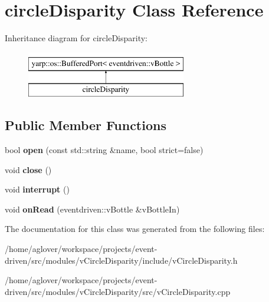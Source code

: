 \hypertarget{classcircleDisparity}{}\section{circle\+Disparity Class Reference}
\label{classcircleDisparity}
Inheritance diagram for circle\+Disparity\+:\begin{figure}[H]
\begin{center}
\leavevmode
\includegraphics[height=2.000000cm]{classcircleDisparity}
\end{center}
\end{figure}
\subsection*{Public Member Functions}
\begin{DoxyCompactItemize}
\item 
bool {\bfseries open} (const std\+::string \&name, bool strict=false)\hypertarget{classcircleDisparity_a5be77ddfdbb425def639e31b53226687}{}\label{classcircleDisparity_a5be77ddfdbb425def639e31b53226687}

\item 
void {\bfseries close} ()\hypertarget{classcircleDisparity_ac492ff92d6e537bdfcee8aac01413d1f}{}\label{classcircleDisparity_ac492ff92d6e537bdfcee8aac01413d1f}

\item 
void {\bfseries interrupt} ()\hypertarget{classcircleDisparity_a190e0c9fc70997a3925fc1f22d0729ad}{}\label{classcircleDisparity_a190e0c9fc70997a3925fc1f22d0729ad}

\item 
void {\bfseries on\+Read} (eventdriven\+::v\+Bottle \&v\+Bottle\+In)\hypertarget{classcircleDisparity_a3585217994a641d81b2c82d39f3f1f72}{}\label{classcircleDisparity_a3585217994a641d81b2c82d39f3f1f72}

\end{DoxyCompactItemize}


The documentation for this class was generated from the following files\+:\begin{DoxyCompactItemize}
\item 
/home/aglover/workspace/projects/event-\/driven/src/modules/v\+Circle\+Disparity/include/v\+Circle\+Disparity.\+h\item 
/home/aglover/workspace/projects/event-\/driven/src/modules/v\+Circle\+Disparity/src/v\+Circle\+Disparity.\+cpp\end{DoxyCompactItemize}
